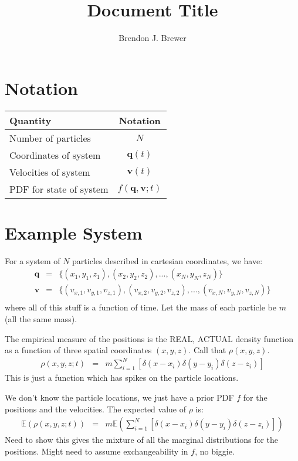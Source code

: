 \documentclass[a4paper, 11pt]{article}
\title{Document Title}
\author{Brendon J. Brewer}
\begin{document}
\maketitle

\section{Notation}

\begin{table}[h!]
\begin{center}
\begin{tabular}{|l|c|}
\hline
{\bf Quantity} & {\bf Notation}\\
\hline
Number of particles & $N$\\
Coordinates of system & $\mathbf{q}(t)$\\
Velocities of system  & $\mathbf{v}(t)$\\
PDF for state of system & $f(\mathbf{q}, \mathbf{v}; t)$\\
\hline
\end{tabular}
\end{center}
\end{table}

\section{Example System}

For a system of $N$ particles described in cartesian coordinates, we have:
\begin{eqnarray}
\mathbf{q} &=& \{(x_1, y_1, z_1), (x_2, y_2, z_2), ..., (x_N, y_N, z_N)\}\\
\mathbf{v} &=& \{(v_{x,1}, v_{y,1}, v_{z,1}), (v_{x,2}, v_{y,2}, v_{z,2}), ..., (v_{x,N}, v_{y,N}, v_{z,N})\}\\
\end{eqnarray}
where all of this stuff is a function of time. Let the mass of each particle be
$m$ (all the same mass).

The empirical measure of the positions is the REAL, ACTUAL density function
as a function of three spatial coordinates $(x, y, z)$. Call that $\rho(x,y,z)$.
\begin{eqnarray}
\rho(x, y, z; t) &=& m \sum_{i=1}^N\left[
\delta(x - x_i)\delta(y - y_i)\delta(z - z_i)
\right]
\end{eqnarray}
This is just a function which has spikes on the particle locations.

We don't know the particle locations, we just have a prior PDF $f$ for the
positions and the velocities. The expected value of $\rho$ is:
\begin{eqnarray}
\mathds{E}\left(\rho(x, y, z; t)\right) &=& m
\mathds{E}\left(
\sum_{i=1}^N\left[
\delta(x - x_i)\delta(y - y_i)\delta(z - z_i)
\right]
\right)
\end{eqnarray}
Need to show this gives the mixture of all the marginal distributions for the
positions. Might need to assume exchangeability in $f$, no biggie.
\end{document}
